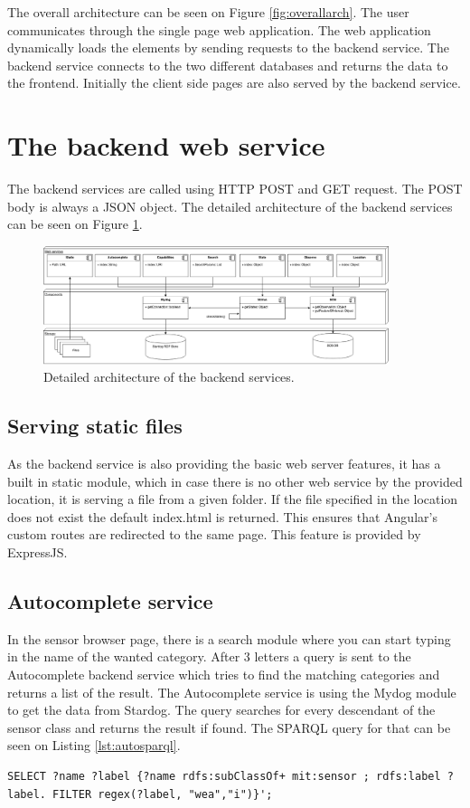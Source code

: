The overall architecture can be seen on Figure \ref{fig:overallarch}. The user communicates through the single page web application. The web application dynamically loads the elements by sending requests to the backend service. The backend service connects to the two different databases and returns the data to the frontend. Initially the client side pages are also served by the backend service. 

\section{The backend web service}

The backend services are called using HTTP POST and GET request. The POST body is always a JSON object. The detailed architecture of the backend services can be seen on Figure \ref{fig:backarch}.


\begin{figure}[h]
\centering
\includegraphics[width=0.9\textwidth]{figures/backendarch.png}
\caption{Detailed architecture of the backend services.\label{fig:backarch}}
\end{figure}

\subsection{Serving static files}
As the backend service is also providing the basic web server features, it has a built in static module, which in case there is no other web service by the provided location, it is serving a file from a given folder. If the file specified in the location does not exist the default index.html is returned. 
This ensures that Angular's custom routes are redirected to the same page. This feature is provided by ExpressJS.

\subsection{Autocomplete service}
In the sensor browser page, there is a search module where you can start typing in the name of the wanted category. After 3 letters a query is sent to the Autocomplete backend service which tries to find the matching categories and returns a list of the result. The Autocomplete service is using the Mydog module to get the data from Stardog. 
The query searches for every descendant of the sensor class and returns the result if found. The SPARQL query for that can be seen on Listing \ref{lst:autosparql}. 
\begin{lstlisting}[caption={SPARQL query for Autocomplete on the "wea" string\label{lst:autosparql}}]
SELECT ?name ?label {?name rdfs:subClassOf+ mit:sensor ; rdfs:label ?label. FILTER regex(?label, "wea","i")}';
\end{lstlisting}

